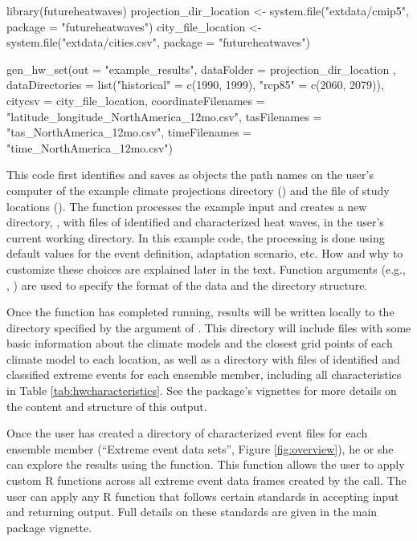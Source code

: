 \begin{Schunk}
\begin{Sinput}
library(futureheatwaves)
projection_dir_location <- system.file("extdata/cmip5",
                                       package = "futureheatwaves")
city_file_location <- system.file("extdata/cities.csv",
                                  package = "futureheatwaves")

gen_hw_set(out = "example_results",
           dataFolder = projection_dir_location ,
           dataDirectories = list("historical" = c(1990, 1999),
                                        "rcp85" = c(2060, 2079)),
           citycsv = city_file_location,
           coordinateFilenames = "latitude_longitude_NorthAmerica_12mo.csv",
           tasFilenames = "tas_NorthAmerica_12mo.csv",
           timeFilenames = "time_NorthAmerica_12mo.csv")
\end{Sinput}
\end{Schunk}

This code first identifies and saves as objects the path names on the
user's computer of the example climate projections directory
() and the file of study locations
(). The  function
processes the example input and creates a new directory,
, with files of identified and characterized heat
waves, in the user's current working directory. In this example code,
the processing is done using default values for the event definition,
adaptation scenario, etc. How and why to customize these choices are
explained later in the text. Function arguments (e.g.,
, ) are used to specify the
format of the data and the directory structure.

Once the function has completed running, results will be written locally
to the directory specified by the  argument of
. This directory will include files with some basic
information about the climate models and the closest grid points of each
climate model to each location, as well as a directory with files of
identified and classified extreme events for each ensemble member,
including all characteristics in Table \ref{tab:hwcharacteristics}. See
the package's vignettes for more details on the content and structure of
this output.

Once the user has created a directory of characterized event files for
each ensemble member (``Extreme event data sets'', Figure
\ref{fig:overview}), he or she can explore the results using the
 function. This function allows the user to
apply custom R functions across all extreme event data frames created by
the  call. The user can apply any R function that
follows certain standards in accepting input and returning output. Full
details on these standards are given in the main package vignette.


